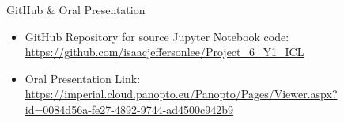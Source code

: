 \documentclass[6pt, final, xcolor=table]{beamer}
\newlength{\sepwidth}
\newlength{\colwidth}
\newcommand{\separatorcolumn}{\begin{column}{\sepwidth}\end{column}}
\begin{document}
\begin{frame}[t]
\begin{columns}[t]
\begin{column}{\colwidth}
  \begin{block}{GitHub \& Oral Presentation}
  \begin{itemize}
      \item GitHub Repository for source Jupyter Notebook code:  \small{\url{https://github.com/isaacjeffersonlee/Project_6_Y1_ICL}}
      \item Oral Presentation Link:  \\
      \small{\url{https://imperial.cloud.panopto.eu/Panopto/Pages/Viewer.aspx?id=0084d56a-fe27-4892-9744-ad4500c942b9}}
  \end{itemize}

 

  \end{block}

\end{column}

\separatorcolumn
\end{columns}
\end{frame}
\end{document}
